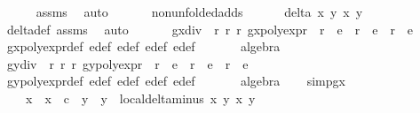 \begin{isabellebody}
\ \ \ \ \isamarkupfalse%
\ assms{\isacharparenleft}{}{\isacharcomma}{}{\isacharparenright}\ \isamarkupfalse%
\ auto\isanewline
\ \ \isanewline
\ \ \isamarkupfalse%
\ non{\isacharunderscore}unfolded{\isacharunderscore}adds{\isacharcolon}\isanewline
\ \ \ \ \ \ {\isachardoublequoteopen}delta\ x{}\ y{}\ x{}\ y{}\ {\isasymnoteq}\ {}{\isachardoublequoteclose}\ \isamarkupfalse%
\ delta{\isacharunderscore}def\ assms{\isacharparenleft}{}{\isacharcomma}{}{\isacharparenright}\ \isamarkupfalse%
\ auto\isanewline
\ \ \isanewline
\ \ \isamarkupfalse%
\ gx{\isacharunderscore}div{\isacharcolon}\ {\isachardoublequoteopen}{\isasymexists}\ r{}\ r{}\ r{}{\isachardot}\ gxpoly{\isacharunderscore}expr\ {\isacharequal}\ r{}\ {\isacharasterisk}\ e{}\ {\isacharplus}\ r{}\ {\isacharasterisk}\ e{}\ {\isacharplus}\ r{}\ {\isacharasterisk}\ e{}{\isachardoublequoteclose}\isanewline
\ \ \ \ \isamarkupfalse%
\ gxpoly{\isacharunderscore}expr{\isacharunderscore}def\ e{}{\isacharunderscore}def\ e{}{\isacharunderscore}def\ e{}{\isacharunderscore}def\ e{\isacharunderscore}def\ \isanewline
\ \ \ \ \isamarkupfalse%
\ algebra\isanewline
\isanewline
\ \ \isamarkupfalse%
\ gy{\isacharunderscore}div{\isacharcolon}\ {\isachardoublequoteopen}{\isasymexists}\ r{}\ r{}\ r{}{\isachardot}\ gypoly{\isacharunderscore}expr\ {\isacharequal}\ r{}\ {\isacharasterisk}\ e{}\ {\isacharplus}\ r{}\ {\isacharasterisk}\ e{}\ {\isacharplus}\ r{}\ {\isacharasterisk}\ e{}{\isachardoublequoteclose}\isanewline
\ \ \ \ \isamarkupfalse%
\ gypoly{\isacharunderscore}expr{\isacharunderscore}def\ e{}{\isacharunderscore}def\ e{}{\isacharunderscore}def\ e{}{\isacharunderscore}def\ e{\isacharunderscore}def\ \isanewline
\ \ \ \ \isamarkupfalse%
\ algebra\isanewline
\isanewline
\ \ \isamarkupfalse%
\ simp{}gx{\isacharcolon}\ {\isachardoublequoteopen}\isanewline
\ \ \ \ {\isacharparenleft}x{}{\isacharprime}\ {\isacharasterisk}\ x{}\ {\isacharminus}\ c\ {\isacharasterisk}\ y{}{\isacharprime}\ {\isacharasterisk}\ y{}{\isacharparenright}\ {\isacharasterisk}\ local{\isachardot}delta{\isacharunderscore}minus\ x{}\ y{}\ x{}{\isacharprime}\ y{}{\isacharprime}\ {\isacharasterisk}\isanewline

\end{isabellebody}
